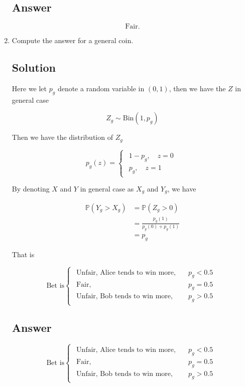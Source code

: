 \documentclass[12pt]{article}
\newcommand{\bP}{\mathbb{P}}
\begin{document}
\begin{enumerate}[start=1,label={\bfseries Part \arabic*:},leftmargin=0in]
		\subsection*{Answer}
		
			\[\boxed{\text{Fair.}}\]
		
		\bigskip\item Compute the answer for a general coin.
		
		\subsection*{Solution}
		
			Here we let $p_g$ denote a random variable in $(0,1)$, then we have the $Z$ in general case
			
			\[Z_g\sim \text{Bin}(1,p_g)\]
			
			Then we have the distribution of $Z_g$
			
			\[
				p_g(z) =
				\begin{cases}
					\begin{aligned}
						1-p_g,\quad z = 0\\
						p_g,\quad z = 1
					\end{aligned}
				\end{cases}
			\]
			
			By denoting $X$ and $Y$ in general case as $X_g$ and $Y_g$, we have
			
			\[
				\begin{aligned}
					\bP(Y_g > X_g) &= \bP(Z_g > 0)\\
					&= \frac{p_g(1)}{p_g(0) + p_g(1)}\\
					&= p_g
				\end{aligned}
			\]
			
			That is
			
			\[
				\text{Bet is}
				\begin{cases}
					\begin{aligned}
						\text{Unfair, Alice tends to win more},&\quad p_g < 0.5\\
						\text{Fair},&\quad p_g = 0.5\\
						\text{Unfair, Bob tends to win more},&\quad p_g > 0.5
					\end{aligned}
				\end{cases}
			\]
		
		\subsection*{Answer}
		
			\[\boxed{\text{Bet is}
				\begin{cases}
					\begin{aligned}
						\text{Unfair, Alice tends to win more},&\quad p_g < 0.5\\
						\text{Fair},&\quad p_g = 0.5\\
						\text{Unfair, Bob tends to win more},&\quad p_g > 0.5
					\end{aligned}
			\end{cases}}\]
	\end{enumerate}
	
\end{document}
